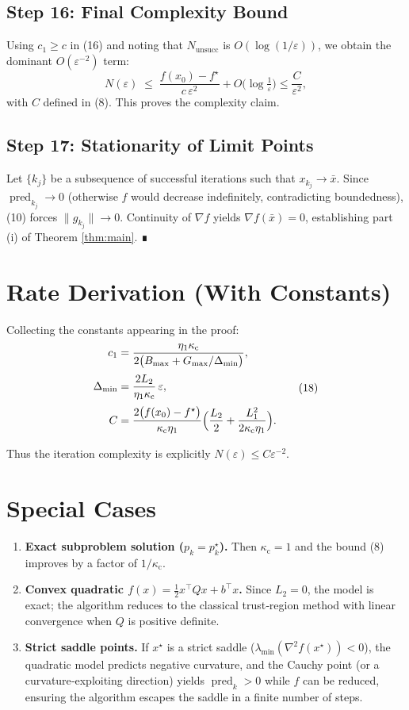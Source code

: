 \documentclass[11pt]{article}
\begin{document}
\subsection*{Step 16: Final Complexity Bound}
Using $c_{1}\ge c$ in (16) and noting that $N_{\text{unsucc}}$ is $O(\log(1/\varepsilon))$, we obtain the dominant $O(\varepsilon^{-2})$ term:
\[
N(\varepsilon)\;\le\;
\frac{f(x_{0})-f^{\star}}{c\,\varepsilon^{2}}+O\!\bigl(\log\tfrac{1}{\varepsilon}\bigr)
\le \frac{C}{\varepsilon^{2}},
\]
with $C$ defined in (8).  This proves the complexity claim.

\subsection*{Step 17: Stationarity of Limit Points}
Let $\{k_{j}\}$ be a subsequence of successful iterations such that $x_{k_{j}}\to\bar x$.  Since $\operatorname{pred}_{k_{j}}\to0$ (otherwise $f$ would decrease indefinitely, contradicting boundedness), (10) forces $\|g_{k_{j}}\|\to0$.  Continuity of $\nabla f$ yields $\nabla f(\bar x)=0$, establishing part (i) of Theorem \ref{thm:main}. ∎

\section*{Rate Derivation (With Constants)}
Collecting the constants appearing in the proof:
\[
\begin{aligned}
c_{1}
&= \frac{\eta_{1}\kappa_{\mathrm{c}}}{2\bigl(B_{\max}+G_{\max}/\Delta_{\min}\bigr)} ,\\[2pt]
\Delta_{\min}
&= \frac{2L_{2}}{\eta_{1}\kappa_{\mathrm{c}}}\,\varepsilon ,\\[2pt]
C
&= \frac{2\bigl(f(x_{0})-f^{\star}\bigr)}{\kappa_{\mathrm{c}}\eta_{1}}
\Bigl(\frac{L_{2}}{2}+ \frac{L_{1}^{2}}{2\kappa_{\mathrm{c}}\eta_{1}}\Bigr).
\end{aligned}
\tag{18}
\]

Thus the iteration complexity is explicitly $N(\varepsilon)\le C\varepsilon^{-2}$.

\section*{Special Cases}
\begin{enumerate}[label=\arabic*.]
\item \textbf{Exact subproblem solution ($p_{k}=p_{k}^{\star}$).}  
Then $\kappa_{\mathrm{c}}=1$ and the bound (8) improves by a factor of $1/\kappa_{\mathrm{c}}$.
\item \textbf{Convex quadratic $f(x)=\tfrac12 x^{\top}Qx+b^{\top}x$.}  
Since $L_{2}=0$, the model is exact; the algorithm reduces to the classical trust‑region method with linear convergence when $Q$ is positive definite.
\item \textbf{Strict saddle points.}  
If $x^{\star}$ is a strict saddle ($\lambda_{\min}(\nabla^{2}f(x^{\star}))<0$), the quadratic model predicts negative curvature, and the Cauchy point (or a curvature‑exploiting direction) yields $\operatorname{pred}_{k}>0$ while $f$ can be reduced, ensuring the algorithm escapes the saddle in a finite number of steps.
\end{enumerate}
\end{document}
